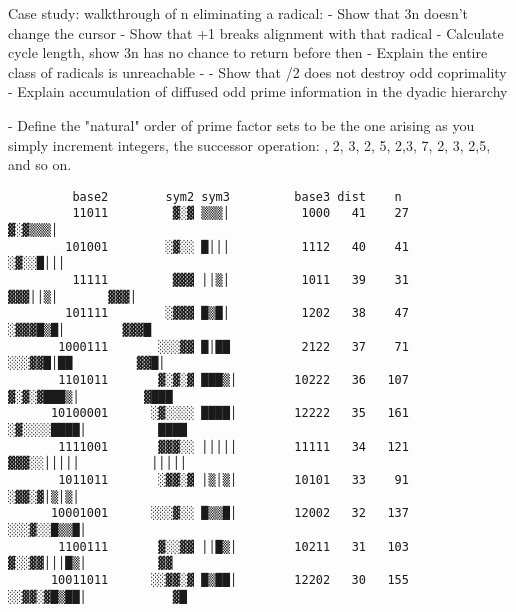 \documentclass[12pt]{article}
\theoremstyle{plain}
\theoremstyle{definition}
\begin{document}
Case study: walkthrough of n eliminating a radical:
- Show that 3n doesn't change the cursor
- Show that +1 breaks alignment with that radical
- Calculate cycle length, show 3n has no chance to return before then
- Explain the entire class of radicals is unreachable
- 
- Show that /2 does not destroy odd coprimality
- Explain accumulation of diffused odd prime information in the dyadic hierarchy

- Define the "natural" order of prime factor sets to be the one arising as you simply increment integers, the successor operation: {}, {2}, {3}, {2}, {5}, {2,3}, {7}, {2}, {3}, {2,5}, and so on.

\begin{lstlisting}
         base2        sym2 sym3         base3 dist    n                                               
         11011         ▓░▓ ▒▒▒│          1000   41    27                                           ▓░▓▒▒▒│                                
        101001        ░▓░░ █│││          1112   40    41                                         ░▓░░█│││                                   
         11111         ▓▓▓ ││▒│          1011   39    31                                         ▓▓▓││▒│       ▓▓▓│                               
        101111        ░▓▓▓ █▒█│          1202   38    47                                       ░▓▓▓█▒█│        ▓▓▓█                               
       1000111       ░░░▓▓ █│██          2122   37    71                                     ░░░▓▓█│██         ▓▓█│                               
       1101011       ▓░▓░▓ ███▒│        10222   36   107                                    ▓░▓░▓███▒│         ▓███                                   
      10100001      ░▓░░░░ ████│        12222   35   161                                  ░▓░░░░████│          ████                                   
       1111001       ▓▓▓░░ │││││        11111   34   121                                  ▓▓▓░░│││││          │││││                                   
       1011011       ░▓▓░▓ │▒│▒│        10101   33    91                                 ░▓▓░▓│▒│▒│                                                       
      10001001      ░░░▓░░ █▒▒█│        12002   32   137                               ░░░▓░░█▒▒█│                                                        
       1100111       ▓░░▓▓ ││█▒│        10211   31   103                               ▓░░▓▓│││█▒│          ▓▓                            
      10011011      ░░▓▓░▓ █▒██│        12202   30   155                             ░░▓▓░▓█▒██│            ▓█                            

\end{lstlisting}
\end{document}
